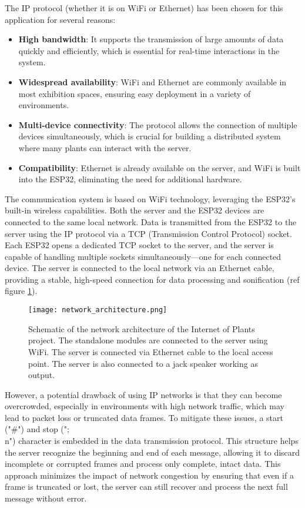 The IP protocol (whether it is on WiFi or Ethernet) has been chosen for this application for several reasons:

\begin{itemize}
    \item \textbf{High bandwidth}: It supports the transmission of large amounts of data quickly and efficiently, which is essential for real-time interactions in the system.
    \item \textbf{Widespread availability}: WiFi and Ethernet are commonly available in most exhibition spaces, ensuring easy deployment in a variety of environments.
    \item \textbf{Multi-device connectivity}: The protocol allows the connection of multiple devices simultaneously, which is crucial for building a distributed system where many plants can interact with the server.
    \item \textbf{Compatibility}: Ethernet is already available on the server, and WiFi is built into the ESP32, eliminating the need for additional hardware.
\end{itemize}

The communication system is based on WiFi technology, leveraging the ESP32's built-in wireless capabilities. Both the server and the ESP32 devices are connected to the same local network. Data is transmitted from the ESP32 to the server using the IP protocol via a TCP (Transmission Control Protocol) socket. Each ESP32 opens a dedicated TCP socket to the server, and the server is capable of handling multiple sockets simultaneously—one for each connected device. The server is connected to the local network via an Ethernet cable, providing a stable, high-speed connection for data processing and sonification (ref figure \ref{fig:network_architecture}).

\begin{figure}[h]
    \centering
    \texttt{[image: network\_architecture.png]}
    \caption{Schematic of the network architecture of the Internet of Plants project. The standalone modules are connected to the server using WiFi. The server is connected via Ethernet cable to the local access point. The server is also connected to a jack speaker working as output.}
    \vspace{0.1cm}
    \label{fig:network_architecture}
\end{figure}

However, a potential drawback of using IP networks is that they can become overcrowded, especially in environments with high network traffic, which may lead to packet loss or truncated data frames. To mitigate these issues, a start ("#") and stop (";\\n") character is embedded in the data transmission protocol. This structure helps the server recognize the beginning and end of each message, allowing it to discard incomplete or corrupted frames and process only complete, intact data. This approach minimizes the impact of network congestion by ensuring that even if a frame is truncated or lost, the server can still recover and process the next full message without error.

